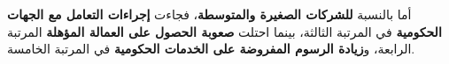 أما بالنسبة \textbf{للشركات الصغيرة والمتوسطة}، فجاءت \textbf{إجراءات التعامل مع الجهات الحكومية} في المرتبة الثالثة، بينما احتلت \textbf{صعوبة الحصول على العمالة المؤهلة} المرتبة الرابعة، و\textbf{زيادة الرسوم المفروضة على الخدمات الحكومية} في المرتبة الخامسة.
